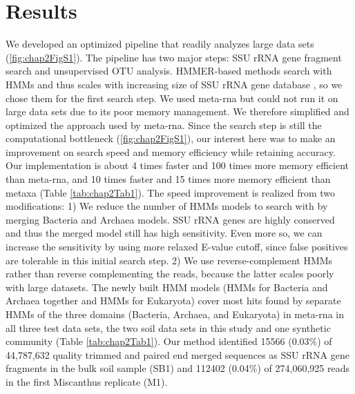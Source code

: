 \documentclass[]{msu-thesis}
\begin{document}
\section{Results}

We developed an optimized pipeline that readily analyzes large data sets (\cref{fig:chap2FigS1}). The pipeline has two major steps: SSU rRNA gene fragment search and unsupervised OTU analysis. HMMER-based methods search with HMMs and thus scales with increasing size of SSU rRNA gene database \cite{cole_ribosomal_2014}, so we chose them for the first search step. We used meta-rna \cite{huang_identification_2009} but could not run it on large data sets due to its poor memory management. We therefore simplified and optimized the approach used by meta-rna. Since the search step is still the computational bottleneck (\cref{fig:chap2FigS1}), our interest here was to make an improvement on search speed and memory efficiency while retaining accuracy. Our implementation is about 4 times faster and 100 times more memory efficient than meta-rna, and 10 times faster and 15 times more memory efficient than metaxa \cite{bengtsson_metaxa:_2011} (Table \ref{tab:chap2Tab1}). The speed improvement is realized from two modifications: 1) We reduce the number of HMMs models to search with by merging Bacteria and Archaea models. SSU rRNA genes are highly conserved and thus the merged model still has high sensitivity. Even more so, we can increase the sensitivity by using more relaxed E-value cutoff, since false positives are tolerable in this initial search step. 2) We use reverse-complement HMMs rather than reverse complementing the reads, because the latter scales poorly with large datasets. The newly built HMM models (HMMs for Bacteria and Archaea together and HMMs for Eukaryota) cover most hits found by separate HMMs of the three domains (Bacteria, Archaea, and Eukaryota) in meta-rna in all three test data sets, the two soil data sets in this study and one synthetic community (Table \ref{tab:chap2Tab1}). Our method identified 15566 (0.03\%) of 44,787,632 quality trimmed and paired end merged sequences as SSU rRNA gene fragments in the bulk soil sample (SB1) and 112402 (0.04\%) of 274,060,925 reads in the first Miscanthus replicate (M1).
\end{document}
